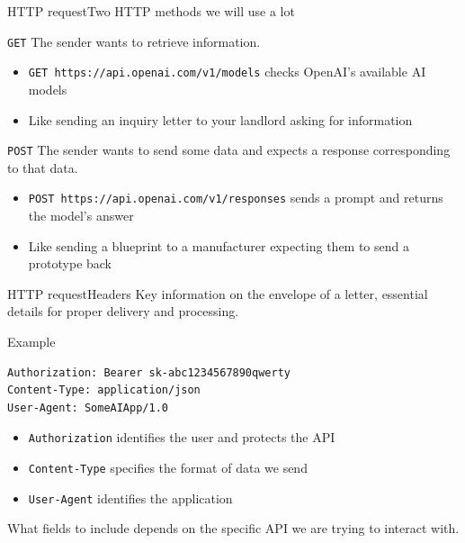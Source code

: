 \documentclass[aspectratio=169]{beamer}
\begin{document}
\begin{frame}{HTTP request}{Two HTTP methods we will use a lot}
    \begin{block}{\texttt{GET}}
        The sender wants to retrieve information.
        \begin{itemize}
            \item \texttt{GET https://api.openai.com/v1/models} checks OpenAI's available AI models
            \item Like sending an inquiry letter to your landlord asking for information
        \end{itemize}
    \end{block}

    \begin{block}{\texttt{POST}}
        The sender wants to send some data and expects a response corresponding to that data.
        \begin{itemize}
            \item \texttt{POST https://api.openai.com/v1/responses} sends a prompt and returns the model's answer
            \item Like sending a blueprint to a manufacturer expecting them to send a prototype back
        \end{itemize}
    \end{block}
\note{
}
\end{frame}


\begin{frame}[fragile]{HTTP request}{Headers}
    Key information on the envelope of a letter, essential details for proper delivery and processing.

    \begin{block}{Example}
        \begin{verbatim}
Authorization: Bearer sk-abc1234567890qwerty
Content-Type: application/json
User-Agent: SomeAIApp/1.0
        \end{verbatim}
    \end{block}

    \begin{itemize}
        \item \texttt{Authorization} identifies the user and protects the API
        \item \texttt{Content-Type} specifies the format of data we send
        \item \texttt{User-Agent} identifies the application
    \end{itemize}

    What fields to include depends on the specific API we are trying to interact with.
\note{
}
\end{frame}
\end{document}
